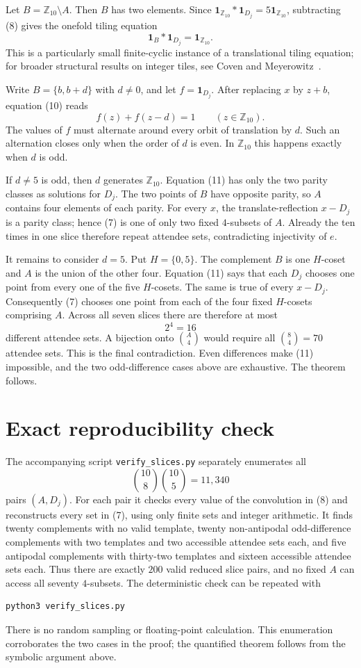 \documentclass[11pt]{article}
\newcommand{\Z}{\mathbb Z}
\newcommand{\ind}{\mathbf 1}
\begin{document}
Let $B=\Z_{10}\setminus A$.  Then $B$ has two elements.  Since
$\ind_{\Z_{10}}*\ind_{D_j}=5\ind_{\Z_{10}}$, subtracting (8) gives the
onefold tiling equation
\[
 \ind_B*\ind_{D_j}=\ind_{\Z_{10}}.                     \tag{10}
\]
This is a particularly small finite-cyclic instance of a translational
tiling equation; for broader structural results on integer tiles, see
Coven and Meyerowitz~\cite{coven1999}.

Write $B=\{b,b+d\}$ with $d\ne0$, and let $f=\ind_{D_j}$.  After replacing
$x$ by $z+b$, equation (10) reads
\[
 f(z)+f(z-d)=1\qquad(z\in\Z_{10}).                       \tag{11}
\]
The values of $f$ must alternate around every orbit of translation by
$d$.  Such an alternation closes only when the order of $d$ is even.  In
$\Z_{10}$ this happens exactly when $d$ is odd.

If $d\ne5$ is odd, then $d$ generates $\Z_{10}$.  Equation (11) has only
the two parity classes as solutions for $D_j$.  The two points of $B$ have
opposite parity, so $A$ contains four elements of each parity.  For every
$x$, the translate-reflection $x-D_j$ is a parity class; hence (7) is one
of only two fixed $4$-subsets of $A$.  Already the ten times in one slice
therefore repeat attendee sets, contradicting injectivity of $e$.

It remains to consider $d=5$.  Put $H=\{0,5\}$.  The complement $B$ is one
$H$-coset and $A$ is the union of the other four.  Equation (11) says that
each $D_j$ chooses one point from every one of the five $H$-cosets.  The
same is true of every $x-D_j$.  Consequently (7) chooses one point from
each of the four fixed $H$-cosets comprising $A$.  Across all seven slices
there are therefore at most
\[
 2^4=16
\]
different attendee sets.  A bijection onto $\binom A4$ would require all
$\binom84=70$ attendee sets.  This is the final contradiction.  Even
differences make (11) impossible, and the two odd-difference cases above
are exhaustive.  The theorem follows.

\section{Exact reproducibility check}

The accompanying script \texttt{verify\_slices.py} separately enumerates
all
\[
 \binom{10}{8}\binom{10}{5}=11{,}340
\]
pairs $(A,D_j)$.  For each pair it checks every value of the convolution in
(8) and reconstructs every set in (7), using only finite sets and integer
arithmetic.  It finds twenty complements with no valid template, twenty
non-antipodal odd-difference complements with two templates and two accessible
attendee sets each, and five antipodal complements with thirty-two templates
and sixteen accessible attendee sets each.  Thus there are exactly $200$
valid reduced slice pairs, and no fixed $A$ can access all seventy
$4$-subsets.  The deterministic check can be repeated with
\begin{verbatim}
python3 verify_slices.py
\end{verbatim}
There is no random sampling or floating-point calculation.  This enumeration
corroborates the two cases in the proof; the quantified theorem follows from
the symbolic argument above.
\end{document}
